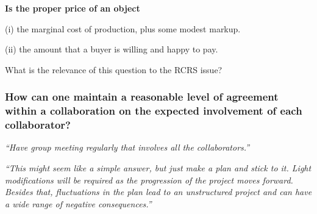 \documentclass[12pt]{beamer}
\newcommand\ans[1]{{\it ``#1''}}
\newcommand\gap{\vspace{5mm}}
\begin{document}
\begin{frame}


{\bf Is the proper price of an object 

(i) the marginal cost of production, plus some modest markup.

(ii) the amount that a buyer is willing and happy to pay.

What is the relevance of this question to the RCRS issue?
}


\end{frame}

\begin{frame} %

\frametitle{How can one maintain a reasonable level of agreement within a collaboration on the expected involvement of each collaborator?}


\ans{Have group meeting regularly that involves all the collaborators.}

\gap

\ans{This  might  seem  like  a  simple  answer,  but  just  make  a  plan  and  stick  to  it.   Light modifications will be required as the progression of the project moves forward.  Besides that,  fluctuations  in  the  plan  lead  to  an  unstructured  project  and  can  have  a  wide range of negative consequences.}




\end{frame}
\end{document}
